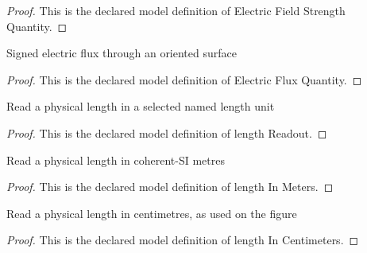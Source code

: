 \begin{proof}
  This is the declared model definition of Electric Field Strength Quantity.
\end{proof}
\begin{definition}
  \label{def:physics:phyx-mini-0845:phyxminiproblems-problemphyxmini0845-electricfluxquantity}
  Signed electric flux through an oriented surface
\end{definition}
\begin{proof}
  This is the declared model definition of Electric Flux Quantity.
\end{proof}
\begin{definition}
  \label{def:physics:phyx-mini-0845:phyxminiproblems-problemphyxmini0845-lengthreadout}
  Read a physical length in a selected named length unit
\end{definition}
\begin{proof}
  This is the declared model definition of length Readout.
\end{proof}
\begin{definition}
  \label{def:physics:phyx-mini-0845:phyxminiproblems-problemphyxmini0845-lengthinmeters}
  Read a physical length in coherent-SI metres
\end{definition}
\begin{proof}
  This is the declared model definition of length In Meters.
\end{proof}
\begin{definition}
  \label{def:physics:phyx-mini-0845:phyxminiproblems-problemphyxmini0845-lengthincentimeters}
  Read a physical length in centimetres, as used on the figure
\end{definition}
\begin{proof}
  This is the declared model definition of length In Centimeters.
\end{proof}
